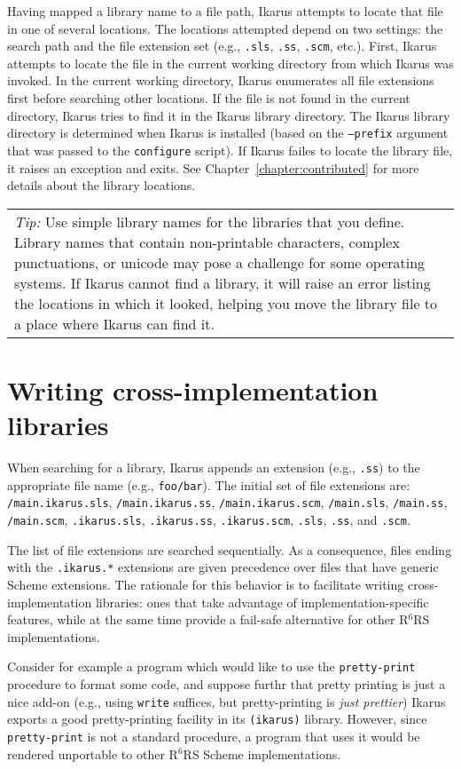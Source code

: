 \documentclass[onecolumn, 12pt, twoside, openright, dvipdfm]{book}
\newcommand{\rnrs}[1]{R$^{\mathrm{#1}}$RS}
\newcommand{\BoxedText}[2]{
  \vspace{.05in}
  \begin{center}
    \begin{tabular}{|p{4.6in}|} {\large \emph{#1}} #2 \end{tabular}
  \end{center}
  \vspace{.05in}
}
\begin{document}
Having mapped a library name to a file path, Ikarus attempts to
locate that file in one of several locations.  The locations
attempted depend on two settings: the search path and the file
extension set (e.g., \verb|.sls|, \verb|.ss|, \verb|.scm|, etc.).
First, Ikarus attempts to locate the file in the current working
directory from which Ikarus was invoked.  In the current working
directory, Ikarus enumerates all file extensions first before
searching other locations.  If the file is not found in the current
directory, Ikarus tries to find it in the Ikarus library directory.
The Ikarus library directory is determined when Ikarus is installed
(based on the \texttt{--prefix} argument that was passed to the
\texttt{configure} script).  If Ikarus failes to locate the library
file, it raises an exception and exits.  See
Chapter~\ref{chapter:contributed} for more details about the library
locations.


\BoxedText{Tip:}{Use simple library names for the libraries that
you define.  Library names that contain non-printable characters,
complex punctuations, or unicode may pose a challenge for some
operating systems.  If Ikarus cannot find a library, it will raise
an error listing the locations in which it looked, helping you move
the library file to a place where Ikarus can find it.}

\section{Writing cross-implementation libraries}

When searching for a library, Ikarus appends an extension (e.g.,
\verb|.ss|) to the appropriate file name (e.g., \verb|foo/bar|).
The initial set of file extensions are: \\
\verb|/main.ikarus.sls|,
\verb|/main.ikarus.ss|, \verb|/main.ikarus.scm|,
\verb|/main.sls|, \verb|/main.ss|, \verb|/main.scm|,
\verb|.ikarus.sls|,
\verb|.ikarus.ss|, \verb|.ikarus.scm|,
\verb|.sls|, \verb|.ss|, and \verb|.scm|.

The list of file extensions are searched sequentially.  As a
consequence, files ending with the \verb|.ikarus.*| extensions are
given precedence over files that have generic Scheme extensions.
The rationale for this behavior is to facilitate writing
cross-implementation libraries: ones that take advantage of
implementation-specific features, while at the same time 
provide a fail-safe alternative for other \rnrs{6}
implementations.

Consider for example a program which would like to use the
\verb|pretty-print| procedure to format some code, and suppose
furthr that pretty printing is just a nice add-on (e.g., using
\verb|write| suffices, but pretty-printing is \emph{just prettier})
Ikarus exports a good pretty-printing facility in its
\verb|(ikarus)| library.  However, since \verb|pretty-print| is not
a standard procedure, a program that uses it would be rendered
unportable to other \rnrs{6} Scheme implementations.  
\end{document}
